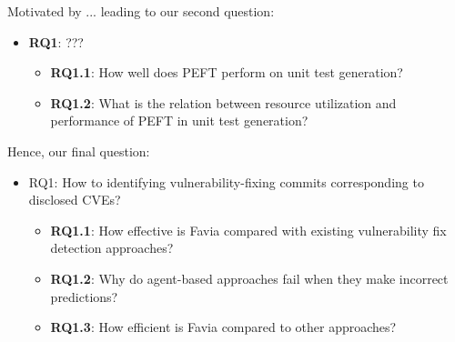 \documentclass[12pt]{book}
\begin{document}
Motivated by ... leading to our second question:

\begin{itemize}
    \item \textbf{RQ1}: ???
    \begin{itemize}
        \item \textbf{RQ1.1}: How well does PEFT perform on unit test generation?
        \item \textbf{RQ1.2}: What is the relation between resource utilization and performance of PEFT in unit test generation?
    \end{itemize}
\end{itemize}


Hence, our final question:

\begin{itemize}
    \item RQ1: How to identifying vulnerability-fixing commits corresponding to disclosed CVEs?
    \begin{itemize}
        \item \textbf{RQ1.1}: How effective is Favia compared with existing vulnerability fix detection approaches?
        \item \textbf{RQ1.2}: Why do agent-based approaches fail when they make incorrect predictions?
        \item \textbf{RQ1.3}: How efficient is Favia compared to other approaches?
    \end{itemize}
\end{itemize}
\end{document}
